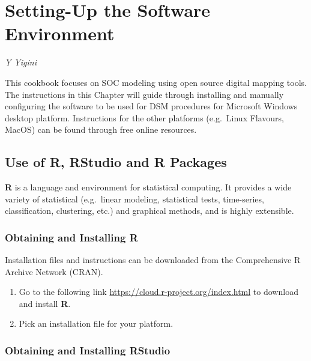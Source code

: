 \documentclass[10pt,b5paper,]{book}
\providecommand{\tightlist}{%
  \setlength{\itemsep}{0pt}\setlength{\parskip}{0pt}}
\theoremstyle{definition}
\theoremstyle{definition}
\theoremstyle{definition}
\theoremstyle{remark}
\begin{document}
\hypertarget{setting-up-the-software-environment}{%
\chapter{Setting-Up the Software
Environment}\label{setting-up-the-software-environment}}

\emph{Y Yigini}

This cookbook focuses on SOC modeling using open source digital mapping
tools. The instructions in this Chapter will guide through installing
and manually configuring the software to be used for DSM procedures for
Microsoft Windows desktop platform. Instructions for the other platforms
(e.g.~Linux Flavours, MacOS) can be found through free online resources.

\hypertarget{use-of-r-rstudio-and-r-packages}{%
\section{Use of R, RStudio and R
Packages}\label{use-of-r-rstudio-and-r-packages}}

\textbf{R} is a language and environment for statistical computing. It
provides a wide variety of statistical (e.g.~linear modeling,
statistical tests, time-series, classification, clustering, etc.) and
graphical methods, and is highly extensible.

\hypertarget{obtaining-and-installing-r}{%
\subsection{Obtaining and Installing
R}\label{obtaining-and-installing-r}}

Installation files and instructions can be downloaded from the
Comprehensive R Archive Network (CRAN).

\begin{enumerate}
\def\labelenumi{\arabic{enumi}.}
\tightlist
\item
  Go to the following link \url{https://cloud.r-project.org/index.html}
  to download and install \textbf{R}.
\item
  Pick an installation file for your platform.
\end{enumerate}

\hypertarget{obtaining-and-installing-rstudio}{%
\subsection{Obtaining and Installing
RStudio}\label{obtaining-and-installing-rstudio}}
\end{document}
